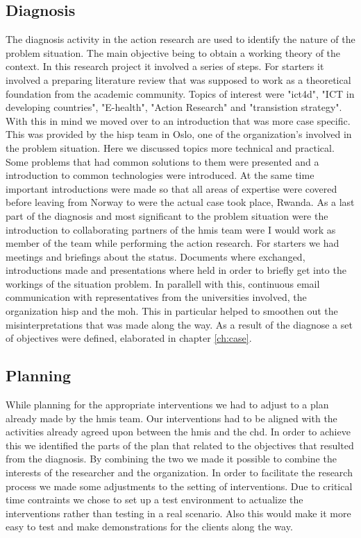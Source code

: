 \subsection{Diagnosis}
The diagnosis activity in the action research are used to identify the nature of the problem situation. 
The main objective being to obtain a working theory of the context.
In this research project it involved a series of steps.
For starters it involved a preparing literature review that was supposed to work as a theoretical foundation from the academic community.
Topics of interest were "ict4d", "ICT in developing countries", "E-health", "Action Research" and "transistion strategy".
With this in mind we moved over to an introduction that was more case specific.
This was provided by the \gls{hisp} team in Oslo, one of the organization's involved in the problem situation.
Here we discussed topics more technical and practical. 
Some problems that had common solutions to them were presented and a introduction to common technologies were introduced.
At the same time important introductions were made so that all areas of expertise were covered before leaving from Norway to were the actual case took place, Rwanda.
As a last part of the diagnosis and most significant to the problem situation were the introduction to collaborating partners of the \gls{hmis} team were I would work as member of the team while performing the action research.
For starters we had meetings and briefings about the status. Documents where exchanged, introductions made and presentations where held in order to briefly get into the workings of the situation problem.
In parallell with this, continuous email communication with representatives from the universities involved, the organization \gls{hisp} and the \gls{moh}. This in particular helped to smoothen out the misinterpretations that was made along the way. 
As a result of the diagnose a set of objectives were defined, elaborated in chapter \ref{ch:case}.
\subsection{Planning}
While planning for the appropriate interventions we had to adjust to a plan already made by the \gls{hmis} team.
Our interventions had to be aligned with the activities already agreed upon between the \gls{hmis} and the \gls{chd}.
In order to achieve this we identified the parts of the plan that related to the objectives that resulted from the diagnosis.
By combining the two we made it possible to combine the interests of the researcher and the organization. 
In order to facilitate the research process we made some adjustments to the setting of interventions. 
Due to critical time contraints we chose to set up a test environment to actualize the interventions rather than testing in a real scenario.
Also this would make it more easy to test and make demonstrations for the clients along the way.

